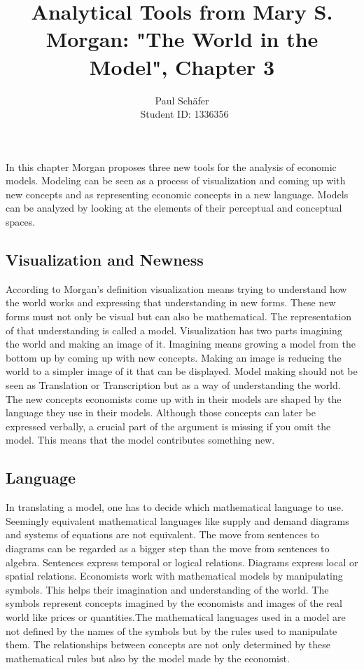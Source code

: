 \documentclass[a4paper, 12pt]{article}
\author{Paul Sch\"afer \\\ Student ID: 1336356}
\begin{document}
\title{Analytical Tools from Mary S. Morgan: "The World in the Model", Chapter 3}
\maketitle
In this chapter Morgan proposes three new tools for the analysis of economic models. Modeling can be seen as a process of visualization and coming up with new concepts and as representing economic concepts in a new language. Models can be analyzed by looking at the elements of their perceptual and conceptual spaces.

\subsection*{Visualization and Newness}
According to Morgan's definition visualization means trying to understand how the world works and expressing that understanding in new forms. These new forms must not only be visual but can also be mathematical. The representation of that understanding is called a model. Visualization has two parts imagining the world and making an image of it. Imagining means growing a model from the bottom up by coming up with new concepts. Making an image is reducing the world to a simpler image of it that can be displayed. Model making should not be seen as Translation or Transcription but as a way of understanding the world. The new concepts economists come up with in their models are shaped by the language they use in their models. Although those concepts can later be expressed verbally, a crucial part of the argument is missing if you omit the model.  This means that the model contributes something new.

\subsection*{Language}
In translating a model, one has to decide which mathematical language to use. Seemingly equivalent mathematical languages like supply and demand diagrams and systems of equations are not equivalent. The move from sentences to diagrams can be regarded as a bigger step than the move from sentences to algebra. Sentences express temporal or logical relations. Diagrams express local or spatial relations. 
Economists work with mathematical models by manipulating symbols. This helps their imagination and understanding of the world. The symbols represent concepts imagined by the economists and images of the real world like prices or quantities.The mathematical languages used in a model are not defined by the names of the symbols but by the rules used to manipulate them.
The relationships between concepts are not only determined by these mathematical rules but also by the model made by the economist. 
\end{document}
